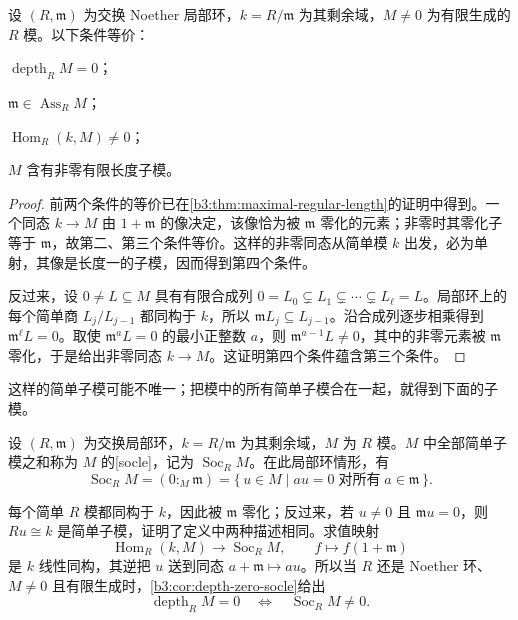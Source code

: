 \begin{corollary}\label{b3:cor:depth-zero-socle}
	设 \((R,\mathfrak m)\) 为交换 Noether 局部环，\(k=R/\mathfrak m\) 为其剩余域，\(M\ne0\) 为有限生成的 \(R\) 模。以下条件等价：
	\begin{equivalences}
		\item \(\operatorname{depth}_RM=0\)；
		\item \(\mathfrak m\in\operatorname{Ass}_RM\)；
		\item \(\operatorname{Hom}_R(k,M)\ne0\)；
		\item \(M\) 含有非零有限长度子模。
	\end{equivalences}
\end{corollary}
\begin{proof}
	前两个条件的等价已在\cref{b3:thm:maximal-regular-length}的证明中得到。一个同态 \(k\rightarrow M\) 由 \(1+\mathfrak m\) 的像决定，该像恰为被 \(\mathfrak m\) 零化的元素；非零时其零化子等于 \(\mathfrak m\)，故第二、第三个条件等价。这样的非零同态从简单模 \(k\) 出发，必为单射，其像是长度一的子模，因而得到第四个条件。

	反过来，设 \(0\ne L\subseteq M\) 具有有限合成列 \(0=L_0\subsetneq L_1\subsetneq\cdots\subsetneq L_\ell=L\)。局部环上的每个简单商 \(L_j/L_{j-1}\) 都同构于 \(k\)，所以 \(\mathfrak mL_j\subseteq L_{j-1}\)。沿合成列逐步相乘得到 \(\mathfrak m^\ell L=0\)。取使 \(\mathfrak m^aL=0\) 的最小正整数 \(a\)，则 \(\mathfrak m^{a-1}L\ne0\)，其中的非零元素被 \(\mathfrak m\) 零化，于是给出非零同态 \(k\to M\)。这证明第四个条件蕴含第三个条件。
\end{proof}

这样的简单子模可能不唯一；把模中的所有简单子模合在一起，就得到下面的子模。

\begin{definition}\label{b3:def:socle}
	设 \((R,\mathfrak m)\) 为交换局部环，\(k=R/\mathfrak m\) 为其剩余域，\(M\) 为 \(R\) 模。\(M\) 中全部简单子模之和称为 \(M\) 的[socle]，记为 \(\operatorname{Soc}_RM\)。在此局部环情形，有
	\[
		\operatorname{Soc}_RM=(0:_M\mathfrak m) =\{\,u\in M\mid au=0\;\text{对所有}\;a\in\mathfrak m\,\}.
	\]
\end{definition}

每个简单 \(R\) 模都同构于 \(k\)，因此被 \(\mathfrak m\) 零化；反过来，若 \(u\ne0\) 且 \(\mathfrak mu=0\)，则 \(Ru\cong k\) 是简单子模，证明了定义中两种描述相同。求值映射
\[
	\operatorname{Hom}_R(k,M)\longrightarrow\operatorname{Soc}_RM, \qquad f\longmapsto f(1+\mathfrak m)
\]
是 \(k\) 线性同构，其逆把 \(u\) 送到同态 \(a+\mathfrak m\mapsto au\)。所以当 \(R\) 还是 Noether 环、\(M\ne0\) 且有限生成时，\cref{b3:cor:depth-zero-socle}给出
\[
	\operatorname{depth}_RM=0\quad\Longleftrightarrow\quad \operatorname{Soc}_RM\ne0.
\]

